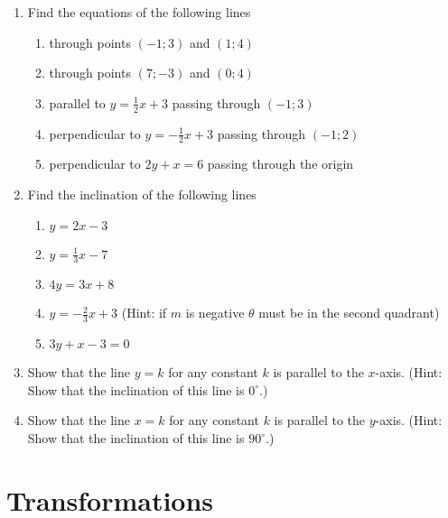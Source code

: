 {
\begin{enumerate}
\item Find the equations of the following lines
\begin{enumerate}
\item through points $(-1;3)$ and $(1;4)$
\item through points $(7;-3)$ and $(0;4)$
\item parallel to $y = \frac{1}{2}x + 3$ passing through $(-1;3)$
\item perpendicular to $y = -\frac{1}{2}x + 3$ passing through $(-1;2)$
\item perpendicular to $2y + x = 6$ passing through the origin
\end{enumerate}

\item Find the inclination of the following lines
\begin{enumerate}
\item $y = 2x -3$
\item $y = \frac{1}{3}x - 7$
\item $4y = 3x + 8$
\item $y = -\frac{2}{3}x + 3$  (Hint: if $m$ is negative $\theta$ must be in the second quadrant)
\item $3y + x - 3 = 0$
\end{enumerate}

\item{Show that the line $y=k$ for any constant $k$ is parallel to the $x$-axis. (Hint: Show that the inclination of this line is $0^{\circ}$.)}
\item{Show that the line $x=k$ for any constant $k$ is parallel to the $y$-axis. (Hint: Show that the inclination of this line is $90^{\circ}$.)}
\end{enumerate}


\practiceinfo}

\section{Transformations}
\label{mg:t}

